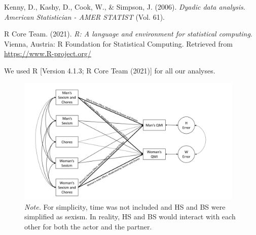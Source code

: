 \documentclass[
  man]{apa6}
\newlength{\cslhangindent}
\newlength{\cslentryspacingunit} %
\newenvironment{CSLReferences}[2] %
 {%
  \setlength{\parindent}{0pt}
  \ifodd #1
  \let\oldpar\par
  \def\par{\hangindent=\cslhangindent\oldpar}
  \fi
  \setlength{\parskip}{#2\cslentryspacingunit}
 }%
 {}
\begin{document}
\begingroup
\setlength{\parindent}{-0.5in}
\setlength{\leftskip}{0.5in}

\hypertarget{refs}{}
\begin{CSLReferences}{1}{0}
\leavevmode{}%
Kenny, D., Kashy, D., Cook, W., \& Simpson, J. (2006). \emph{Dyadic data analysis}. \emph{American Statistician - AMER STATIST} (Vol. 61).

\leavevmode{}%
R Core Team. (2021). \emph{R: A language and environment for statistical computing}. Vienna, Austria: R Foundation for Statistical Computing. Retrieved from \url{https://www.R-project.org/}

\end{CSLReferences}

\endgroup

We used R {[}Version 4.1.3; R Core Team (2021){]} for all our analyses.

\newpage



\begin{figure}
\includegraphics[width=4.27in]{APIM} \caption{\emph{Note.} For simplicity, time was not included and HS and BS were simplified as sexism. In reality, HS and BS would interact with each other for both the actor and the partner.}\label{fig:apim-fig}
\end{figure}
\end{document}
